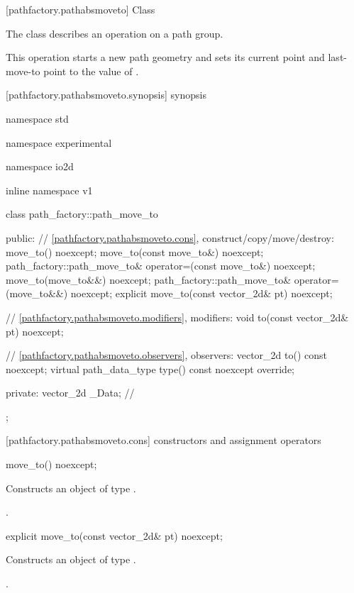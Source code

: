  [pathfactory.pathabsmoveto] {Class }

\pnum
{}
The class  describes an operation on a path group.

\pnum
This operation starts a new path geometry and sets its current point and last-move-to point to the value of .

 [pathfactory.pathabsmoveto.synopsis] { synopsis}

\begin{codeblock}
namespace std { namespace experimental { namespace io2d { inline namespace v1 {
  class path_factory::path_move_to {
  public:
    // \ref{pathfactory.pathabsmoveto.cons}, construct/copy/move/destroy:
    move_to() noexcept;
    move_to(const move_to&) noexcept;
    path_factory::path_move_to& operator=(const move_to&) noexcept;
    move_to(move_to&&) noexcept;
    path_factory::path_move_to& operator=(move_to&&) noexcept;
    explicit move_to(const vector_2d& pt) noexcept;

    // \ref{pathfactory.pathabsmoveto.modifiers}, modifiers:
    void to(const vector_2d& pt) noexcept;

    // \ref{pathfactory.pathabsmoveto.observers}, observers:
    vector_2d to() const noexcept;
    virtual path_data_type type() const noexcept override;
    
  private:
    vector_2d _Data; // \expos
  };
} } } }
\end{codeblock}

 [pathfactory.pathabsmoveto.cons] { constructors and assignment operators}

\begin{itemdecl}
    move_to() noexcept;
\end{itemdecl}
\begin{itemdescr}
	\pnum
	\effects
	Constructs an object of type .
	
	\pnum
	\postconditions
	.
\end{itemdescr}

\begin{itemdecl}
    explicit move_to(const vector_2d& pt) noexcept;
\end{itemdecl}
\begin{itemdescr}
	\pnum
	\effects
	Constructs an object of type .
	
	\pnum
	\postconditions
	.
\end{itemdescr}

